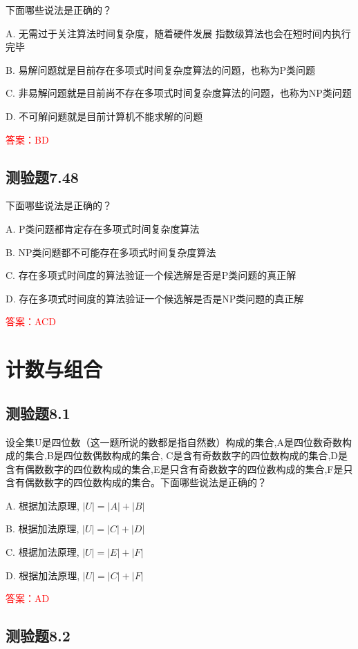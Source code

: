 \documentclass[UTF8, heading=true]{ctexart}
\begin{document}
下面哪些说法是正确的？

A. 无需过于关注算法时间复杂度，随着硬件发展
指数级算法也会在短时间内执行完毕

B. 易解问题就是目前存在多项式时间复杂度算法的问题，也称为P类问题

C. 非易解问题就是目前尚不存在多项式时间复杂度算法的问题，也称为NP类问题

D. 不可解问题就是目前计算机不能求解的问题

\textcolor{red}{答案：BD}

\subsection{测验题7.48}

下面哪些说法是正确的？

A. P类问题都肯定存在多项式时间复杂度算法

B. NP类问题都不可能存在多项式时间复杂度算法

C. 存在多项式时间度的算法验证一个候选解是否是P类问题的真正解

D. 存在多项式时间度的算法验证一个候选解是否是NP类问题的真正解

\textcolor{red}{答案：ACD}

\clearpage
\section{计数与组合}

\subsection{测验题8.1}

设全集U是四位数（这一题所说的数都是指自然数）构成的集合,A是四位数奇数构成的集合,B是四位数偶数构成的集合,
C是含有奇数数字的四位数构成的集合,D是含有偶数数字的四位数构成的集合,E是只含有奇数数字的四位数构成的集合,F是只含有偶数数字的四位数构成的集合。下面哪些说法是正确的？

A. 根据加法原理, $|U|=|A|+|B|$

B. 根据加法原理, $|U|=|C|+|D|$

C. 根据加法原理, $|U|=|E|+|F|$

D. 根据加法原理, $|U|=|C|+|F|$

\textcolor{red}{答案：AD}

\subsection{测验题8.2}
\end{document}
